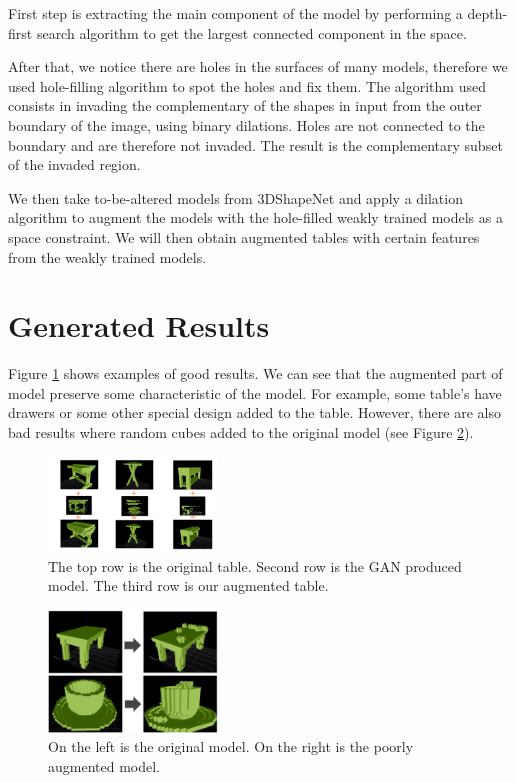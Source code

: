 \documentclass{sigchi}
\begin{document}
First step is extracting the main component of the model by performing a depth-first search algorithm to get the largest connected component in the space.

After that, we notice there are holes in the surfaces of many models, therefore we used hole-filling algorithm to spot the holes and fix them. The algorithm used consists in invading the complementary of the shapes in input from the outer boundary of the image, using binary dilations. Holes are not connected to the boundary and are therefore not invaded. The result is the complementary subset of the invaded region.

We then take to-be-altered models from 3DShapeNet and apply a dilation algorithm to augment the models with the hole-filled weakly trained models as a space constraint. We will then obtain augmented tables with certain features from the weakly trained models.


\section{Generated Results}

Figure \ref{fig:table_results} shows examples of good results. We can see that the augmented part of model preserve some characteristic of the model. For example, some table’s have drawers or some other special design added to the table. However, there are also bad results where random cubes added to the original model (see Figure \ref{fig:bad_results}). 

\begin{figure}
\includegraphics[width=0.4\textwidth]{figs/table_results.png}
\centering
\caption{The top row is the original table. Second row is the GAN produced model. The third row is our augmented table.}
\label{fig:table_results}
\end{figure}

\begin{figure}
\includegraphics[width=0.4\textwidth]{figs/bad_results.png}
\centering
\caption{On the left is the original model. On the right is the poorly augmented model.}
\label{fig:bad_results}
\end{figure}
\end{document}
